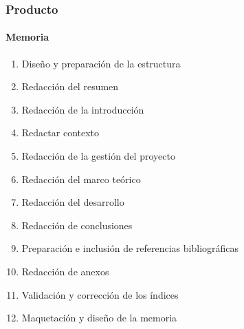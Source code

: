 \subsubsection{Producto}
\paragraph{Memoria}
\begin{enumerate}
    \item Diseño y preparación de la estructura
    \item Redacción del resumen %
    \item Redacción de la introducción %
    \item Redactar contexto %
    \item Redacción de la gestión del proyecto %
    \item Redacción del marco teórico %
    \item Redacción del desarrollo %
    \item Redacción de conclusiones %
    \item Preparación e inclusión de referencias bibliográficas %
    \item Redacción de anexos %
    \item Validación y corrección de los índices %
    \item Maquetación y diseño de la memoria %
\end{enumerate}
